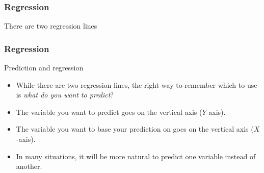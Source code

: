 \documentclass[handout]{beamer}
\begin{document}


   \begin{frame}
   \frametitle{Regression}
   \begin{center}
   \end{center}
   There are two regression lines
   \end{frame}


   \begin{frame} \frametitle{Regression}

   \begin{block}
   {Prediction and regression}
   \begin{itemize}
   \item While there are two regression lines, the right way
   to remember which to use is {\em \color{red} what do you want to predict}?
   \item The variable you want to predict goes on the vertical axis ($Y$-axis).
   \item The variable you want to base your prediction on  goes on the vertical axis ($X$-axis).
   \item In many situations, it will be more natural to predict
   one variable instead of another.
   \end{itemize}
   \end{block}
   \end{frame}
\end{document}
